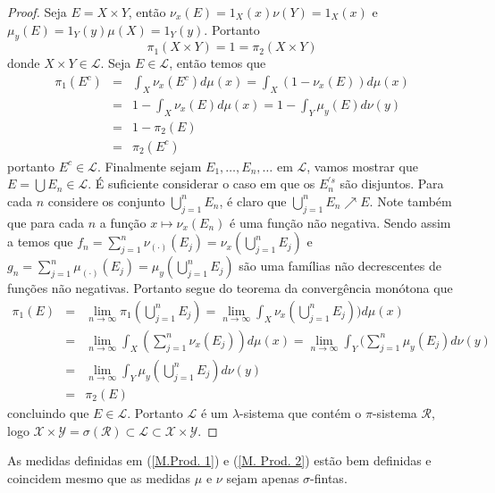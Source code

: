 \begin{proof}
Seja $E=X\times Y$, então $\nu_x(E)=1_X(x)\nu(Y)=1_X(x)$ e $\mu_y(E)=1_Y(y)\mu(X)=1_Y(y)$. Portanto 
$$
\pi_1(X\times Y)=1=\pi_2(X\times Y)
$$
donde $X\times Y\in \mathscr{L}$. Seja $E\in \mathscr{L}$, então temos que
$$
\begin{array}{rcl}
\pi_1(E^c)&=&\displaystyle\int_X \nu_x(E^c)d\mu(x)
=
\int_X (1-\nu_x(E))d\mu(x)
\\[5mm]
&
=
&
\displaystyle 1-\int_X\nu_x(E) d\mu (x)
=
1-\int_Y \mu_y(E)d\nu(y)
\\[5mm]
&
=
&
1-\pi_2(E)
\\[5mm]
&
=
&
\pi_2(E^c)
\end{array}
$$
portanto $E^c\in \mathscr{L}$.  
Finalmente sejam $E_1, \ldots, E_n, \ldots $ em $\mathscr{L}$, vamos
mostrar que $E=\bigcup E_n\in \mathscr{L}.$ É suficiente considerar
o caso em que os $E_n^{'s}$ são disjuntos. Para cada $n$ considere os
conjunto $\bigcup_{j=1}^nE_n$, é claro que   $\bigcup_{j=1}^nE_n\nearrow E.$ Note
também que para cada $n$ a função $x\mapsto \nu_x(E_n)$ é uma função não negativa.
Sendo assim a temos que  $f_n=\sum_{j=1}^n\nu_{(\cdot)}(E_j)=\nu_x(\bigcup_{j=1}^{n}E_j)$
e $g_n=\sum_{j=1}^n\mu_{(\cdot)}(E_j)=\mu_y(\bigcup_{j=1}^{n}E_j)$ são
uma famílias não decrescentes de funções não negativas.
Portanto segue do teorema da convergência monótona
que
$$
\begin{array}{rcl}
\pi_1(E)&=&\displaystyle\lim_{n\to \infty}\pi_1(\bigcup_{j=1}^{n}E_j)
=
\lim_{n\to \infty}\int_X \nu_x(\bigcup_{j=1}^{n}E_j))d\mu(x)
\\[5mm]
&
=
&
\displaystyle \lim_{n\to \infty}\int_X (\sum_{j=1}^n\nu_x(E_j)) d\mu(x)
=
\lim_{n\to \infty}\int_Y(\sum_{j=1}^{n}\mu_y(E_j)d\nu(y)
\\[5mm]
&
=
&
\displaystyle\lim_{n\to \infty} \int_Y \mu_y(\bigcup_{j=1}^{n}E_j)d\nu(y)
\\
&=&
\pi_2(E)
\end{array}
$$
concluindo que $E\in \mathscr{L}$. Portanto $\mathscr{L}$ é um $\lambda$-sistema 
que contém o $\pi$-sistema $\mathscr{R}$, logo $\mathscr{X}\times \mathscr{Y}=\sigma(\mathscr{R})\subset \mathscr{L}\subset \mathscr{X}\times \mathscr{Y}.$

\end{proof}

\begin{corolario}
As medidas definidas em (\ref{M.Prod. 1}) e (\ref{M. Prod. 2}) estão bem definidas e  coincidem mesmo que as medidas 
$\mu$ e $\nu$ sejam apenas $\sigma$-fintas.
\end{corolario}

